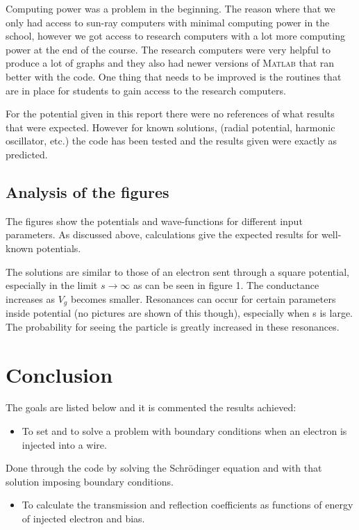 \documentclass[a4paper]{article}
\begin{document}
Computing power was a problem in the beginning. The reason where that we only had access to sun-ray computers with minimal computing power in the school, however we got access to research computers with a lot more computing power at the end of the course. The research computers were very helpful to produce a lot of graphs and they also had newer versions of \textsc{Matlab} that ran better with the code. One thing that needs to be improved is the routines that are in place for students to gain access to the research computers.


For the potential given in this report there were no references of what results that were expected. However for known solutions, (radial potential, harmonic oscillator, etc.) the code has been tested and the results given were exactly as predicted.

\subsection{Analysis of the figures}
The figures show the potentials and wave-functions for different input parameters. As discussed above, calculations give the expected results for well-known potentials.

The solutions are similar to those of an electron sent through a square potential,
especially in the limit $ s \rightarrow \infty $ as can be seen in figure 1. The conductance increases as $V_g$ becomes smaller. Resonances can occur for certain parameters inside potential (no pictures are shown of this though), especially when s is large. The probability for seeing the particle is greatly increased in these resonances.
 

\section{Conclusion}

The goals are listed below and it is commented the results achieved:
\begin{itemize}
\item To set and to solve a problem with boundary conditions when an electron is injected into a wire.
\end{itemize}
Done through the code by solving the Schr\"odinger equation and with that solution imposing boundary conditions.
\begin{itemize}
\item To calculate the transmission and reflection coefficients as  functions of energy of injected electron and bias.
\end{itemize}
\end{document}

